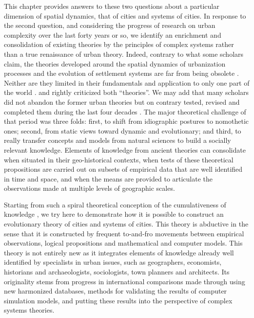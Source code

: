 \documentclass[10pt,letterpaper]{article}
\begin{document}
This chapter provides answers to these two questions about a particular dimension of spatial dynamics, that of cities and systems of cities. In response to the second question, and considering the progress of research on urban complexity over the last forty years or so, we identify an enrichment and consolidation of existing theories by the principles of complex systems rather than a true renaissance of urban theory. Indeed, contrary to what some scholars claim, the theories developed around the spatial dynamics of urbanization processes and the evolution of settlement systems are far from being obsolete \citep{brenner2014urban}. Neither are they limited in their fundamentals and application to only one part of the world \citep{robinson2016comparative}. \cite{scott2015nature} and \cite{wu2020emerging} rightly criticized both ``theories''. We may add that many scholars did not abandon the former urban theories but on contrary tested, revised and completed them during the last four decades \citep{pumain1997pour,pumain1998urban,pumain2003approche,pumain2020theories,batty2013new}. The major theoretical challenge of that period was three folds: first, to shift from idiographic postures to nomothetic ones; second, from static views toward dynamic and evolutionary; and third, to really transfer concepts and models from natural sciences to build a socially relevant knowledge. Elements of knowledge from ancient theories can consolidate when situated in their geo-historical contexts, when tests of these theoretical propositions are carried out on subsets of empirical data that are well identified in time and space, and when the means are provided to articulate the observations made at multiple levels of geographic scales.

Starting from such a spiral theoretical conception of the cumulativeness of knowledge \citep{pumain2005cumulativite}, we try here to demonstrate how it is possible to construct an evolutionary theory of cities and systems of cities. This theory is abductive in the sense that it is constructed by frequent to-and-fro movements between empirical observations, logical propositions and mathematical and computer models. This theory is not entirely new as it integrates elements of knowledge already well identified by specialists in urban issues, such as geographers, economists, historians and archaeologists, sociologists, town planners and architects. Its originality stems from progress in international comparisons made through using new harmonized databases, methods for validating the results of computer simulation models, and putting these results into the perspective of complex systems theories.
\end{document}
